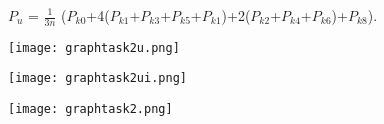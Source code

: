	\centerline{$P_{u}$ = $\frac{1}{3n}$ ($P_{k0}$+4($P_{k1}$+$P_{k3}$+$P_{k5}$+$P_{k1}$)+2($P_{k2}$+$P_{k4}$+$P_{k6}$)+$P_{k8}$).}

	\begin{center}
		\texttt{[image: graphtask2u.png]}
	\end{center}

	\begin{center}
		\texttt{[image: graphtask2ui.png]}
	\end{center}

	\begin{center}
		\texttt{[image: graphtask2.png]}
	\end{center}
